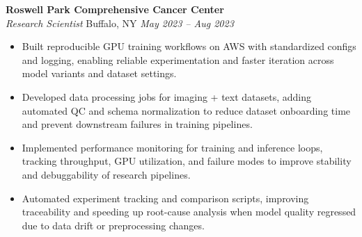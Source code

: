 \vspace*{-1pt}
\item \textbf{Roswell Park Comprehensive Cancer Center}\\
\textit{Research Scientist} \hfill Buffalo, NY \quad \textit{May 2023 -- Aug 2023}
\vspace*{-3pt}
\begin{itemize}[leftmargin=0.2in, topsep=1pt]
  \item Built reproducible GPU training workflows on AWS with standardized configs and logging, enabling reliable experimentation and faster iteration across model variants and dataset settings.
  \item Developed data processing jobs for imaging + text datasets, adding automated QC and schema normalization to reduce dataset onboarding time and prevent downstream failures in training pipelines.
  \item Implemented performance monitoring for training and inference loops, tracking throughput, GPU utilization, and failure modes to improve stability and debuggability of research pipelines.
  \item Automated experiment tracking and comparison scripts, improving traceability and speeding up root-cause analysis when model quality regressed due to data drift or preprocessing changes.
\end{itemize}

